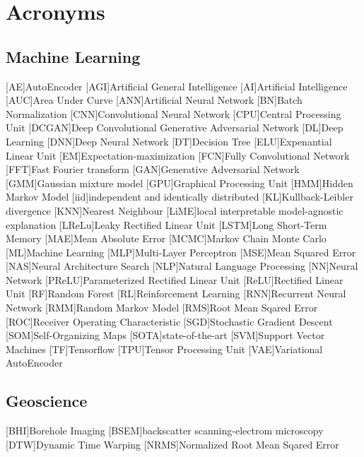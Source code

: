 \chapter{Acronyms}

\section{Machine Learning}
\begin{acronym}[dcgan]
[AE]{AutoEncoder}
[AGI]{Artificial General Intelligence}
[AI]{Artificial Intelligence}
[AUC]{Area Under Curve}
[ANN]{Artificial Neural Network}
[BN]{Batch Normalization}
[CNN]{Convolutional Neural Network}
[CPU]{Central Processing Unit}
[DCGAN]{Deep Convolutional Generative Adversarial Network}
[DL]{Deep Learning}
[DNN]{Deep Neural Network}
[DT]{Decision Tree}
[ELU]{Expenantial Linear Unit}
[EM]{Expectation-maximization}
[FCN]{Fully Convolutional Network}
[FFT]{Fast Fourier transform}
[GAN]{Generative Adversarial Network}
[GMM]{Gaussian mixture model}
[GPU]{Graphical Processing Unit}
[HMM]{Hidden Markov Model} 
[iid]{independent and identically distributed}
[KL]{Kullback-Leibler divergence}
[KNN]{Nearest Neighbour}
[LiME]{local interpretable model-agnostic explanation}
[LReLu]{Leaky Rectified Linear Unit}
[LSTM]{Long Short-Term Memory}
[MAE]{Mean Absolute Error}
[MCMC]{Markov Chain Monte Carlo}
[ML]{Machine Learning}
[MLP]{Multi-Layer Perceptron}
[MSE]{Mean Squared Error}
[NAS]{Neural Architecture Search}
[NLP]{Natural Language Processing}
[NN]{Neural Network}
[PReLU]{Parameterized Rectified Linear Unit}
[ReLU]{Rectified Linear Unit}
[RF]{Random Forest}
[RL]{Reinforcement Learning}
[RNN]{Recurrent Neural Network}
[RMM]{Random Markov Model}
[RMS]{Root Mean Sqared Error}
[ROC]{Receiver Operating Characteristic}
[SGD]{Stochastic Gradient Descent}
[SOM]{Self-Organizing Maps}
[SOTA]{state-of-the-art}
[SVM]{Support Vector Machines}
[TF]{Tensorflow}
[TPU]{Tensor Processing Unit}
[VAE]{Variational AutoEncoder}
\end{acronym}

\section{Geoscience}
\begin{acronym}[bsem]
[BHI]{Borehole Imaging}
[BSEM]{backscatter scanning-electrom microscopy}
[DTW]{Dynamic Time Warping}
[NRMS]{Normalized Root Mean Sqared Error}
\end{acronym}

